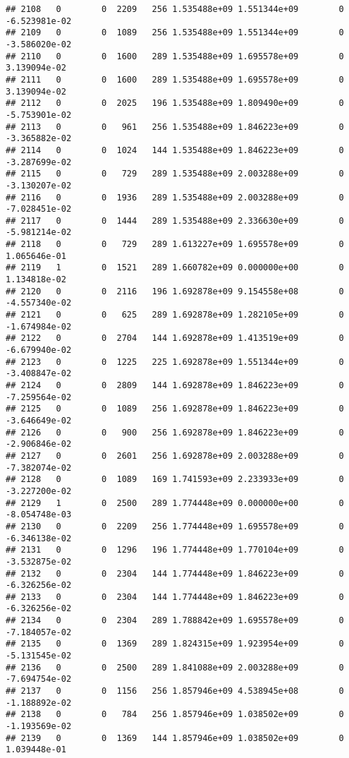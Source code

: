 \documentclass[
]{article}
\begin{document}
\begin{enumerate}
\begin{verbatim}
## 2108   0        0  2209   256 1.535488e+09 1.551344e+09        0 -6.523981e-02
## 2109   0        0  1089   256 1.535488e+09 1.551344e+09        0 -3.586020e-02
## 2110   0        0  1600   289 1.535488e+09 1.695578e+09        0  3.139094e-02
## 2111   0        0  1600   289 1.535488e+09 1.695578e+09        0  3.139094e-02
## 2112   0        0  2025   196 1.535488e+09 1.809490e+09        0 -5.753901e-02
## 2113   0        0   961   256 1.535488e+09 1.846223e+09        0 -3.365882e-02
## 2114   0        0  1024   144 1.535488e+09 1.846223e+09        0 -3.287699e-02
## 2115   0        0   729   289 1.535488e+09 2.003288e+09        0 -3.130207e-02
## 2116   0        0  1936   289 1.535488e+09 2.003288e+09        0 -7.028451e-02
## 2117   0        0  1444   289 1.535488e+09 2.336630e+09        0 -5.981214e-02
## 2118   0        0   729   289 1.613227e+09 1.695578e+09        0  1.065646e-01
## 2119   1        0  1521   289 1.660782e+09 0.000000e+00        0  1.134818e-02
## 2120   0        0  2116   196 1.692878e+09 9.154558e+08        0 -4.557340e-02
## 2121   0        0   625   289 1.692878e+09 1.282105e+09        0 -1.674984e-02
## 2122   0        0  2704   144 1.692878e+09 1.413519e+09        0 -6.679940e-02
## 2123   0        0  1225   225 1.692878e+09 1.551344e+09        0 -3.408847e-02
## 2124   0        0  2809   144 1.692878e+09 1.846223e+09        0 -7.259564e-02
## 2125   0        0  1089   256 1.692878e+09 1.846223e+09        0 -3.646649e-02
## 2126   0        0   900   256 1.692878e+09 1.846223e+09        0 -2.906846e-02
## 2127   0        0  2601   256 1.692878e+09 2.003288e+09        0 -7.382074e-02
## 2128   0        0  1089   169 1.741593e+09 2.233933e+09        0 -3.227200e-02
## 2129   1        0  2500   289 1.774448e+09 0.000000e+00        0 -8.054748e-03
## 2130   0        0  2209   256 1.774448e+09 1.695578e+09        0 -6.346138e-02
## 2131   0        0  1296   196 1.774448e+09 1.770104e+09        0 -3.532875e-02
## 2132   0        0  2304   144 1.774448e+09 1.846223e+09        0 -6.326256e-02
## 2133   0        0  2304   144 1.774448e+09 1.846223e+09        0 -6.326256e-02
## 2134   0        0  2304   289 1.788842e+09 1.695578e+09        0 -7.184057e-02
## 2135   0        0  1369   289 1.824315e+09 1.923954e+09        0 -5.131545e-02
## 2136   0        0  2500   289 1.841088e+09 2.003288e+09        0 -7.694754e-02
## 2137   0        0  1156   256 1.857946e+09 4.538945e+08        0 -1.188892e-02
## 2138   0        0   784   256 1.857946e+09 1.038502e+09        0 -1.193569e-02
## 2139   0        0  1369   144 1.857946e+09 1.038502e+09        0  1.039448e-01

\end{verbatim}
\end{enumerate}
\end{document}
